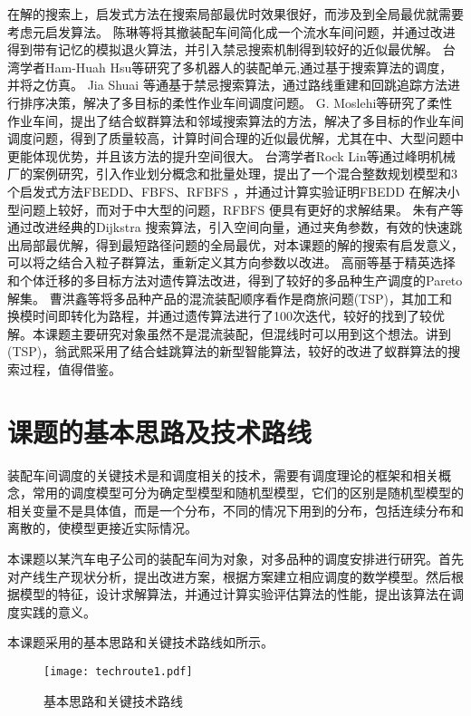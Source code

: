 在解的搜索上，启发式方法在搜索局部最优时效果很好，而涉及到全局最优就需要考虑元启发算法。
陈琳\cite{陈琳2009}等将其撤装配车间简化成一个流水车间问题，并通过改进得到带有记忆的模拟退火算法，并引入禁忌搜索机制得到较好的近似最优解。
台湾学者Ham-Huah Hsu\cite{hsu1995fully}等研究了多机器人的装配单元,通过基于搜索算法的调度，并将之仿真。
Jia Shuai\cite{jia2014path} 等通基于禁忌搜索算法，通过路线重建和回跳追踪方法进行排序决策，解决了多目标的柔性作业车间调度问题。
G. Moslehi\cite{moslehi2011pareto}等研究了柔性作业车间，提出了结合蚁群算法和邻域搜索算法的方法，解决了多目标的作业车间调度问题，得到了质量较高，计算时间合理的近似最优解，尤其在中、大型问题中更能体现优势，并且该方法的提升空间很大。
台湾学者Rock Lin\cite{lin2012case}等通过峰明机械厂的案例研究，引入作业划分概念和批量处理，提出了一个混合整数规划模型和3个启发式方法FBEDD、FBFS、RFBFS ，并通过计算实验证明FBEDD 在解决小型问题上较好，而对于中大型的问题，RFBFS 便具有更好的求解结果。
朱有产\cite{朱有产2006}等通过改进经典的Dijkstra 搜索算法，引入空间向量，通过夹角参数，有效的快速跳出局部最优解，得到最短路径问题的全局最优，对本课题的解的搜索有启发意义，可以将之结合入粒子群算法，重新定义其方向参数以改进。
高丽\cite{高丽2012}等基于精英选择和个体迁移的多目标方法对遗传算法改进，得到了较好的多品种生产调度的Pareto 解集。
曹洪鑫\cite{曾洪鑫2006}等将多品种产品的混流装配顺序看作是商旅问题(TSP)，其加工和换模时间即转化为路程，并通过遗传算法进行了100次迭代，较好的找到了较优解。本课题主要研究对象虽然不是混流装配，但混线时可以用到这个想法。讲到(TSP)，翁武熙\cite{翁武熙2012混合蚁群算法求解}采用了结合蛙跳算法的新型智能算法，较好的改进了蚁群算法的搜索过程，值得借鉴。


\section{课题的基本思路及技术路线}
装配车间调度的关键技术是和调度相关的技术，需要有调度理论的框架和相关概念，常用的调度模型可分为确定型模型和随机型模型，它们的区别是随机型模型的相关变量不是具体值，而是一个分布，不同的情况下用到的分布，包括连续分布和离散的，使模型更接近实际情况。

本课题以某汽车电子公司的装配车间为对象，对多品种的调度安排进行研究。首先对产线生产现状分析，提出改进方案，根据方案建立相应调度的数学模型。然后根据模型的特征，设计求解算法，并通过计算实验评估算法的性能，提出该算法在调度实践的意义。


本课题采用的基本思路和关键技术路线如所示。
\begin{figure}[h]
\centering
\texttt{[image: techroute1.pdf]}
\caption{基本思路和关键技术路线\label{fig:1}}
\end{figure}
